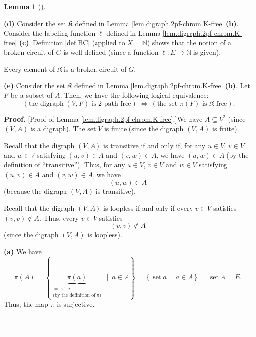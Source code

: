 \documentclass[numbers=enddot,12pt,final,onecolumn,notitlepage]{scrartcl}%
\theoremstyle{definition}
\newtheorem{lem}[theo]{Lemma}
\newenvironment{lemma}[1][]
{\begin{lem}[#1]\begin{leftbar}}
{\end{leftbar}\end{lem}}
\newenvironment{proof}[1][Proof]{\noindent\textbf{#1.} }{\ \rule{0.5em}{0.5em}}
\newenvironment{verlong}{}{}
\begin{document}
\begin{verlong}
\begin{lemma}
\textbf{(d)} Consider the set $\mathfrak{K}$ defined in Lemma
\ref{lem.digraph.2pf-chrom.K-free} \textbf{(b)}. Consider the labeling
function $\ell$ defined in Lemma \ref{lem.digraph.2pf-chrom.K-free}
\textbf{(c)}. Definition \ref{def.BC} (applied to $X=\mathbb{N}$) shows that
the notion of a broken circuit of $G$ is well-defined (since a function
$\ell:E\rightarrow\mathbb{N}$ is given).

Every element of $\mathfrak{K}$ is a broken circuit of $G$.

\textbf{(e)} Consider the set $\mathfrak{K}$ defined in Lemma
\ref{lem.digraph.2pf-chrom.K-free} \textbf{(b)}. Let $F$ be a subset of $A$.
Then, we have the following logical equivalence:%
\[
\ \left(  \text{the digraph }\left(  V,F\right)  \text{ is }2\text{-path-free}%
\right)  \ \Longleftrightarrow\ \left(  \text{the set }\pi\left(  F\right)
\text{ is }\mathfrak{K}\text{-free}\right)  .
\]

\end{lemma}

\begin{proof}
[Proof of Lemma \ref{lem.digraph.2pf-chrom.K-free}.]We have $A\subseteq V^{2}$
(since $\left(  V,A\right)  $ is a digraph). The set $V$ is finite (since the
digraph $\left(  V,A\right)  $ is finite).

Recall that the digraph $\left(  V,A\right)  $ is transitive if and only if,
for any $u\in V$, $v\in V$ and $w\in V$ satisfying $\left(  u,v\right)  \in A$
and $\left(  v,w\right)  \in A$, we have $\left(  u,w\right)  \in A$ (by the
definition of \textquotedblleft transitive\textquotedblright). Thus, for any
$u\in V$, $v\in V$ and $w\in V$ satisfying $\left(  u,v\right)  \in A$ and
$\left(  v,w\right)  \in A$, we have
\begin{equation}
\left(  u,w\right)  \in A \label{pf.lem.digraph.2pf-chrom.K-free.transitive}%
\end{equation}
(because the digraph $\left(  V,A\right)  $ is transitive).

Recall that the digraph $\left(  V,A\right)  $ is loopless if and only if
every $v\in V$ satisfies $\left(  v,v\right)  \notin A$. Thus, every $v\in V$
satisfies%
\begin{equation}
\left(  v,v\right)  \notin A \label{pf.lem.digraph.2pf-chrom.K-free.loopless}%
\end{equation}
(since the digraph $\left(  V,A\right)  $ is loopless).

\textbf{(a)} We have
\[
\pi\left(  A\right)  =\left\{  \underbrace{\pi\left(  a\right)  }%
_{\substack{=\operatorname*{set}a\\\text{(by the definition of }\pi\text{)}%
}}\ \mid\ a\in A\right\}  =\left\{  \operatorname*{set}a\ \mid\ a\in
A\right\}  =\operatorname*{set}A=E.
\]
Thus, the map $\pi$ is surjective.


\end{proof}
\end{verlong}
\end{document}
